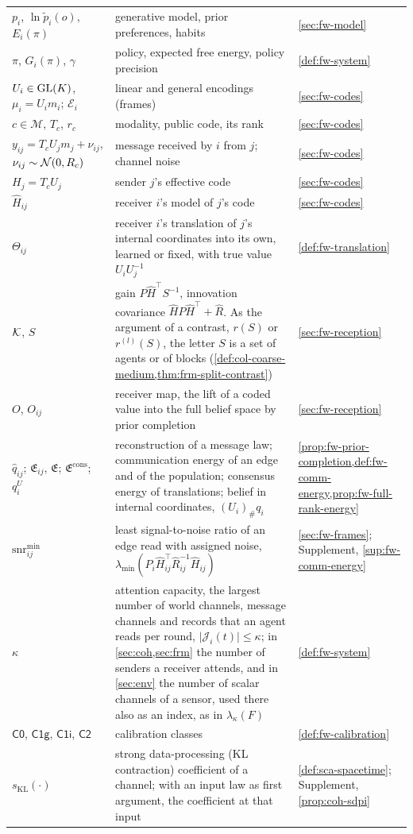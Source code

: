 \begin{longtable}{@{}>{\raggedright\arraybackslash}p{}>{\raggedright\arraybackslash}p{}>{\raggedright\arraybackslash}p{}@{}}
$p_i$, $\ln\tilde p_i(o)$, $E_i(\pi)$ & generative model, prior preferences, habits & \cref{sec:fw-model}\\
$\pi$, $G_i(\pi)$, $\gamma$ & policy, expected free energy, policy precision & \cref{def:fw-system}\\
$U_i\in\mathrm{GL}(K)$, $\mu_i=U_im_i$; $\mathcal E_i$ & linear and general encodings (frames) & \cref{sec:fw-codes}\\
$c\in\mathcal M$, $T_c$, $r_c$ & modality, public code, its rank & \cref{sec:fw-codes}\\
$y_{ij}=T_cU_jm_j+\nu_{ij}$, $\nu_{ij}\sim\mathcal{N}(0,R_c)$ & message received by $i$ from $j$; channel noise & \cref{sec:fw-codes}\\
$H_j=T_cU_j$ & sender $j$'s effective code & \cref{sec:fw-codes}\\
$\hat H_{ij}$ & receiver $i$'s model of $j$'s code & \cref{sec:fw-codes}\\
$\Theta_{ij}$ & receiver $i$'s translation of $j$'s internal coordinates into its own, learned or fixed, with true value $U_iU_j^{-1}$ & \cref{def:fw-translation}\\
$\mathcal{K}$, $S$ & gain $P\hat H^\top S^{-1}$, innovation covariance $\hat HP\hat H^\top+\hat R$. As the argument of a contrast, $r(S)$ or $r^{(l)}(S)$, the letter $S$ is a set of agents or of blocks (\cref{def:col-coarse-medium,thm:frm-split-contrast}) & \cref{sec:fw-reception}\\
$O$, $O_{ij}$ & receiver map, the lift of a coded value into the full belief space by prior completion & \cref{sec:fw-reception}\\
$\hat q_{ij}$; $\mathfrak E_{ij}$, $\mathfrak E$; $\mathfrak E^{\mathrm{cons}}$; $q^U_i$ & reconstruction of a message law; communication energy of an edge and of the population; consensus energy of translations; belief in internal coordinates, $(U_i)_\#q_i$ & \cref{prop:fw-prior-completion,def:fw-comm-energy,prop:fw-full-rank-energy}\\
$\mathrm{snr}^{\min}_{ij}$ & least signal-to-noise ratio of an edge read with assigned noise, $\lambda_{\min}(P_i\hat H_{ij}^\top\hat R_{ij}^{-1}\hat H_{ij})$ & \cref{sec:fw-frames}; Supplement, \cref{sup:fw-comm-energy}\\
$\kappa$ & attention capacity, the largest number of world channels, message channels and records that an agent reads per round, $\lvert\mathcal J_i(t)\rvert\le\kappa$; in \cref{sec:coh,sec:frm} the number of senders a receiver attends, and in \cref{sec:env} the number of scalar channels of a sensor, used there also as an index, as in $\lambda_\kappa(F)$ & \cref{def:fw-system}\\
$\mathsf{C0}$, $\mathsf{C1g}$, $\mathsf{C1i}$, $\mathsf{C2}$ & calibration classes & \cref{def:fw-calibration}\\
$s_{\mathrm{KL}}(\cdot)$ & strong data-processing (KL contraction) coefficient of a channel; with an input law as first argument, the coefficient at that input & \cref{def:sca-spacetime}; Supplement, \cref{prop:coh-sdpi}\\
\end{longtable}
